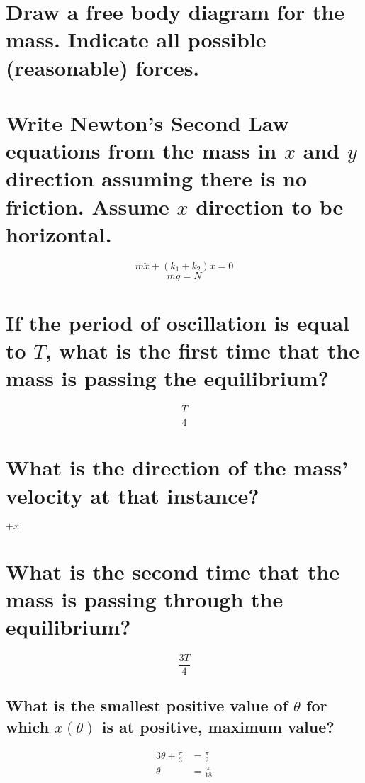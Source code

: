 \documentclass[answers]{exam}
\begin{document}
\begin{questions}
\begin{parts}
	\part{Draw a free body diagram for the mass. Indicate all possible (reasonable) forces.}
	\part{Write Newton's Second Law equations from the mass in $x$ and $y$ direction assuming there is no friction. Assume $x$ direction to be horizontal.}
	\begin{solution}
		$$m\ddot{x} + (k_1 + k_2) x = 0$$
		$$mg = N$$
	\end{solution}
	\part{If the period of oscillation is equal to $T$, what is the first time that the mass is passing the equilibrium?}
	\begin{solution}
		$$\frac{T}{4}$$
	\end{solution}
	\part{What is the direction of the mass' velocity at that instance?}
	\begin{solution}
			$+x$
	\end{solution}
	\part{What is the second time that the mass is passing through the equilibrium?}
	\begin{solution}
		$$\frac{3T}{4}$$
	\end{solution}
\end{parts}


\begin{parts}
	\part{What is the smallest positive value of $\theta$ for which $x(\theta)$ is at positive, maximum value?}
	\begin{solution}
		\begin{align*}
			3\theta + \frac{\pi}{3} &= \frac{\pi}{2} \\
			\theta &= \frac{\pi}{18} \\
		\end{align*}
	\end{solution}

\end{parts}
\end{questions}
\end{document}
